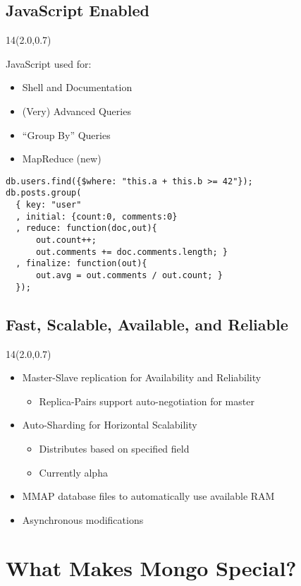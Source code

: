 \documentclass{beamer}
\newcommand{\MongoLogo}{%
\begin{textblock}{14}(2.0,0.7)
  \pgfuseimage{logo}
\end{textblock}
}
\begin{document}
\subsection{JavaScript Enabled}
\begin{frame}[fragile]
  \MongoLogo
  JavaScript used for:
  \begin{itemize}
    \item Shell and Documentation
    \item (Very) Advanced Queries
    \item ``Group By'' Queries
    \item MapReduce (new)
  \end{itemize}

  \begin{verbatim}
db.users.find({$where: "this.a + this.b >= 42"});
db.posts.group(
  { key: "user"
  , initial: {count:0, comments:0}
  , reduce: function(doc,out){
      out.count++;
      out.comments += doc.comments.length; }
  , finalize: function(out){ 
      out.avg = out.comments / out.count; }
  });
  \end{verbatim}
\end{frame}

\subsection{Fast, Scalable, Available, and Reliable}
\begin{frame}
  \MongoLogo
  \begin{itemize}
  \item Master-Slave replication for Availability and Reliability
    \begin{itemize}
      \item Replica-Pairs support auto-negotiation for master
    \end{itemize}
  \item Auto-Sharding for Horizontal Scalability
    \begin{itemize}
      \item Distributes based on specified field
      \item Currently alpha
    \end{itemize}
  \item MMAP database files to automatically use available RAM
  \item Asynchronous modifications
  \end{itemize}
\end{frame}

\section{What Makes Mongo Special?}
\end{document}
